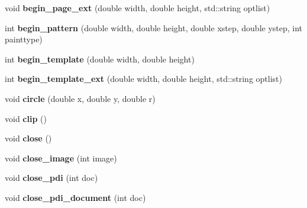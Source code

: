 \begin{DoxyCompactItemize}
\item 
\hypertarget{classPDFlib_ac656d2651dab7cd9dc27e6fb7e24674b}{void {\bfseries begin\-\_\-page\-\_\-ext} (double width, double height, std\-::string optlist)}\label{classPDFlib_ac656d2651dab7cd9dc27e6fb7e24674b}

\item 
\hypertarget{classPDFlib_a4f448cf3fb5e4376c8f5665b209309b2}{int {\bfseries begin\-\_\-pattern} (double width, double height, double xstep, double ystep, int painttype)}\label{classPDFlib_a4f448cf3fb5e4376c8f5665b209309b2}

\item 
\hypertarget{classPDFlib_a0a17dc423a0b09f0fe3da38184a0c58a}{int {\bfseries begin\-\_\-template} (double width, double height)}\label{classPDFlib_a0a17dc423a0b09f0fe3da38184a0c58a}

\item 
\hypertarget{classPDFlib_af52208d3c75b94fa260e930379add01e}{int {\bfseries begin\-\_\-template\-\_\-ext} (double width, double height, std\-::string optlist)}\label{classPDFlib_af52208d3c75b94fa260e930379add01e}

\item 
\hypertarget{classPDFlib_a829708ea81ca5fdc782b41671d289024}{void {\bfseries circle} (double x, double y, double r)}\label{classPDFlib_a829708ea81ca5fdc782b41671d289024}

\item 
\hypertarget{classPDFlib_ac975ffef2d14cd63e59c2721934ccc7c}{void {\bfseries clip} ()}\label{classPDFlib_ac975ffef2d14cd63e59c2721934ccc7c}

\item 
\hypertarget{classPDFlib_ae9242dfb19f5367436a6964546d9d4e6}{void {\bfseries close} ()}\label{classPDFlib_ae9242dfb19f5367436a6964546d9d4e6}

\item 
\hypertarget{classPDFlib_ac063ee8ba65df5795c8f488a2238cf7f}{void {\bfseries close\-\_\-image} (int image)}\label{classPDFlib_ac063ee8ba65df5795c8f488a2238cf7f}

\item 
\hypertarget{classPDFlib_a8b4d6ae7f6df6ac04d54b3f1449849f1}{void {\bfseries close\-\_\-pdi} (int doc)}\label{classPDFlib_a8b4d6ae7f6df6ac04d54b3f1449849f1}

\item 
\hypertarget{classPDFlib_aefcbc8ddb1ef96388f6f2c61f7e05d7e}{void {\bfseries close\-\_\-pdi\-\_\-document} (int doc)}\label{classPDFlib_aefcbc8ddb1ef96388f6f2c61f7e05d7e}


\end{DoxyCompactItemize}
